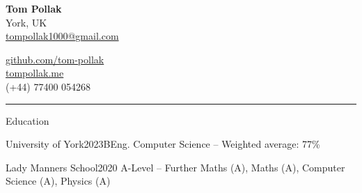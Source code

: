 \documentclass{structure}
\begin{document}
\parbox{0.5\textwidth}{
    {\namesize\bf{Tom Pollak}} \\[6pt]
    York, UK\\
    \href{mailto:tompollak1000@gmail.com}{tompollak1000@gmail.com}
}
\hfill
\parbox{0.5\textwidth}{
    \vspace*{10pt}

    \begin{flushright}

        \href{https://github.com/tom-pollak}{github.com/tom-pollak} \\
        \href{https://tompollak.me}{tompollak.me} \\
        (+44) 77400 054268
    \end{flushright}

}

\smallskip
\hrule
\smallskip

\begin{rSection}{Education}

    \begin{rSubsectionNoList}{University of York}{2023}{BEng. Computer Science -- Weighted average: 77\% }{}{}
    \end{rSubsectionNoList}

    \begin{rSubsectionNoList}{Lady Manners School}{2020}{
            A-Level --  Further Maths (A), Maths (A), Computer Science (A), Physics (A)
        }{}{}
    \end{rSubsectionNoList}

\end{rSection}

\end{document}
